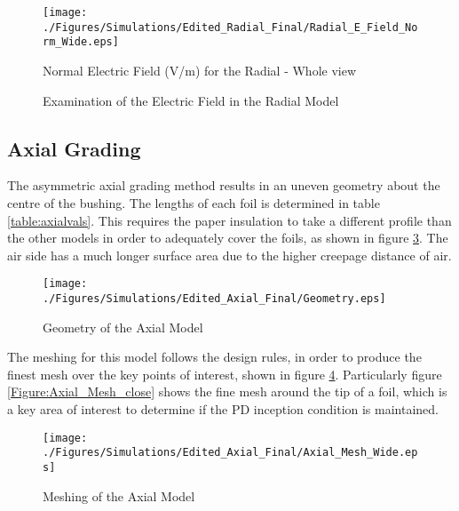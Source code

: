 \begin{figure}[!h]
  \centering
    \texttt{[image: ./Figures/Simulations/Edited\_Radial\_Final/Radial\_E\_Field\_Norm\_Wide.eps]} 
	\caption{Normal Electric Field (V/m) for the Radial - Whole view}
	\label{Figure:Radial_Field_Wide}
   \end{figure}

\begin{figure}[!h]
  \centering
{} 
\caption{Examination of the Electric Field in the Radial Model}
\label{Figure:Radial_Field}
\end{figure}




\subsection{Axial Grading}
The asymmetric axial grading method results in an uneven geometry about the centre of the bushing.
The lengths of each foil is determined in table \ref{table:axialvals}.
This requires the paper insulation to take a different profile than the other models in order to adequately cover the foils, as shown in figure \ref{Figure:Axial_Geom}.
The air side has a much longer surface area due to the higher creepage distance of air.
\begin{figure}[!h]
  \centering
    \texttt{[image: ./Figures/Simulations/Edited\_Axial\_Final/Geometry.eps]} 
	\caption{Geometry of the Axial Model}
	\label{Figure:Axial_Geom}
\end{figure}

The meshing for this model follows the design rules, in order to produce the finest mesh over the key points of interest, shown in figure \ref{Figure:Axial_Mesh_wide}.
Particularly figure \ref{Figure:Axial_Mesh_close} shows the fine mesh around the tip of a foil, which is a key area of interest to determine if the PD inception condition is maintained.
\begin{figure}[!h]
  \centering
    \texttt{[image: ./Figures/Simulations/Edited\_Axial\_Final/Axial\_Mesh\_Wide.eps]} 
	\caption{Meshing of the Axial Model}
	\label{Figure:Axial_Mesh_wide}
\end{figure}

